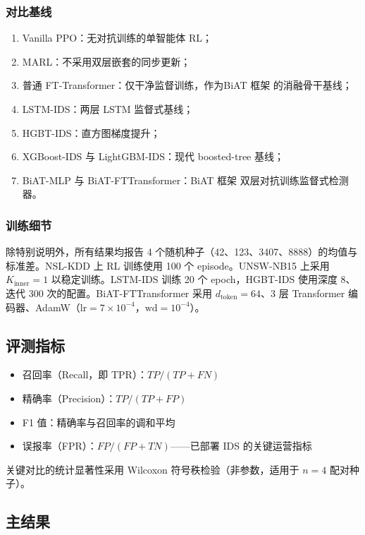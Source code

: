 \documentclass[12pt,a4paper]{ctexart}
\begin{document}
\subsubsection{对比基线}

\begin{enumerate}
    \item Vanilla PPO：无对抗训练的单智能体 RL；
    \item MARL：不采用双层嵌套的同步更新；
    \item 普通 FT-Transformer：仅干净监督训练，作为BiAT 框架 的消融骨干基线；
    \item LSTM-IDS：两层 LSTM 监督式基线\cite{staudemeyer2019lstm}；
    \item HGBT-IDS：直方图梯度提升；
    \item XGBoost-IDS 与 LightGBM-IDS：现代 boosted-tree 基线；
    \item BiAT-MLP 与 BiAT-FTTransformer：BiAT 框架 双层对抗训练监督式检测器。
\end{enumerate}

\subsubsection{训练细节}

除特别说明外，所有结果均报告 4 个随机种子（42、123、3407、8888）的均值与标准差。NSL-KDD 上 RL 训练使用 100 个 episode。UNSW-NB15 上采用 $K_{\text{inner}}=1$ 以稳定训练。LSTM-IDS 训练 20 个 epoch，HGBT-IDS 使用深度 8、迭代 300 次的配置。BiAT-FTTransformer 采用 $d_{\text{token}}=64$、3 层 Transformer 编码器、AdamW（$\text{lr}=7\times10^{-4}$，$\text{wd}=10^{-4}$）。

\subsection{评测指标}

\begin{itemize}
    \item 召回率（Recall，即 TPR）：$TP/(TP+FN)$
    \item 精确率（Precision）：$TP/(TP+FP)$
    \item F1 值：精确率与召回率的调和平均
    \item 误报率（FPR）：$FP/(FP+TN)$——已部署 IDS 的关键运营指标
\end{itemize}

关键对比的统计显著性采用 Wilcoxon 符号秩检验（非参数，适用于 $n=4$ 配对种子）。

\subsection{主结果}
\end{document}
